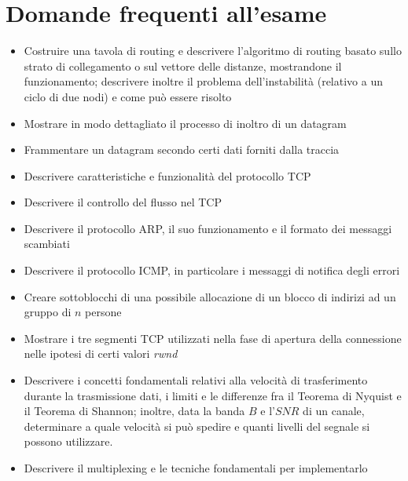 \section{Domande frequenti all'esame}

\begin{itemize}
    \item
    Costruire una tavola di routing e descrivere l'algoritmo di routing basato sullo strato di collegamento o sul vettore delle distanze, mostrandone il funzionamento; descrivere inoltre il problema dell'instabilità (relativo a un ciclo di due nodi) e come può essere risolto
    
    \item
    Mostrare in modo dettagliato il processo di inoltro di un datagram
    
    \item
    Frammentare un datagram secondo certi dati forniti dalla traccia
    
    \item
    Descrivere caratteristiche e funzionalità del protocollo TCP
    
    \item
    Descrivere il controllo del flusso nel TCP
    
    \item
    Descrivere il protocollo ARP, il suo funzionamento e il formato dei messaggi scambiati
    
    \item
    Descrivere il protocollo ICMP, in particolare i messaggi di notifica degli errori
    
    \item
    Creare sottoblocchi di una possibile allocazione di un blocco di indirizi ad un gruppo di $n$ persone
    
    \item
    Mostrare i tre segmenti TCP utilizzati nella fase di apertura della connessione nelle ipotesi di certi valori \textit{rwnd}
    
    \item
    Descrivere i concetti fondamentali relativi alla velocità di trasferimento durante la trasmissione dati, i limiti e le differenze fra il Teorema di Nyquist e il Teorema di Shannon; inoltre, data la banda $B$ e l'$SNR$ di un canale, determinare a quale velocità si può spedire e quanti livelli del segnale si possono utilizzare. 
    
    \item
    Descrivere il multiplexing e le tecniche fondamentali per implementarlo
    

\end{itemize}
